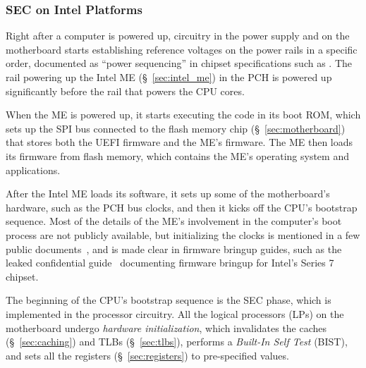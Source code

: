 \subsubsection{SEC on Intel Platforms}
\label{sec:uefi_sec_details}


Right after a computer is powered up, circuitry in the power supply and on the
motherboard starts establishing reference voltages on the power rails in a
specific order, documented as ``power sequencing'' \cite{intel2010bringup} in
chipset specifications such as \cite{intel2015x99chipset}. The rail powering up
the Intel ME (\S~\ref{sec:intel_me}) in the PCH is powered up significantly
before the rail that powers the CPU cores.

When the ME is powered up,  it starts executing the code in its boot ROM, which
sets up the SPI bus connected to the flash memory chip
(\S~\ref{sec:motherboard}) that stores both the UEFI firmware and the ME's
firmware. The ME then loads its firmware from flash memory, which contains the
ME's operating system and applications.


After the Intel ME loads its software, it sets up some of the motherboard's
hardware, such as the PCH bus clocks, and then it kicks off the CPU's bootstrap
sequence. Most of the details of the ME's involvement in the computer's boot
process are not publicly available, but initializing the clocks is mentioned in
a few public documents~\cite{intel2015cpuio, purism2014meclock,
dice2011meclock, fitpc2014mehw}, and is made clear in firmware bringup guides,
such as the leaked confidential guide~\cite{intel2012mebringup} documenting
firmware bringup for Intel's Series 7 chipset.


The beginning of the CPU's bootstrap sequence is the SEC phase, which is
implemented in the processor circuitry. All the logical processors (LPs) on the
motherboard undergo \textit{hardware initialization}, which invalidates the
caches (\S~\ref{sec:caching}) and TLBs (\S~\ref{sec:tlbs}), performs a
\textit{Built-In Self Test} (BIST), and sets all the registers
(\S~\ref{sec:registers}) to pre-specified values.


